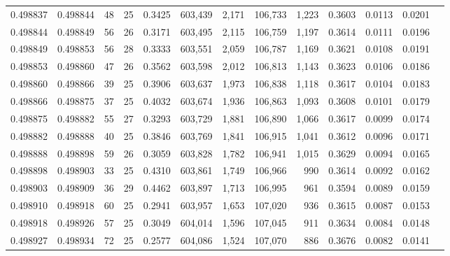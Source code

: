 \begin{tabular}{rrrrrrrrrrrrr}
0.498837 & 0.498844 &  48 &  25 &                                     0.3425 & 603,439 &   2,171 & 106,733 &   1,223 & 0.3603 & 0.0113 & 0.0201 \\
0.498844 & 0.498849 &  56 &  26 &                                     0.3171 & 603,495 &   2,115 & 106,759 &   1,197 & 0.3614 & 0.0111 & 0.0196 \\
0.498849 & 0.498853 &  56 &  28 &                                     0.3333 & 603,551 &   2,059 & 106,787 &   1,169 & 0.3621 & 0.0108 & 0.0191 \\
0.498853 & 0.498860 &  47 &  26 &                                     0.3562 & 603,598 &   2,012 & 106,813 &   1,143 & 0.3623 & 0.0106 & 0.0186 \\
0.498860 & 0.498866 &  39 &  25 &                                     0.3906 & 603,637 &   1,973 & 106,838 &   1,118 & 0.3617 & 0.0104 & 0.0183 \\
0.498866 & 0.498875 &  37 &  25 &                                     0.4032 & 603,674 &   1,936 & 106,863 &   1,093 & 0.3608 & 0.0101 & 0.0179 \\
0.498875 & 0.498882 &  55 &  27 &                                     0.3293 & 603,729 &   1,881 & 106,890 &   1,066 & 0.3617 & 0.0099 & 0.0174 \\
0.498882 & 0.498888 &  40 &  25 &                                     0.3846 & 603,769 &   1,841 & 106,915 &   1,041 & 0.3612 & 0.0096 & 0.0171 \\
0.498888 & 0.498898 &  59 &  26 &                                     0.3059 & 603,828 &   1,782 & 106,941 &   1,015 & 0.3629 & 0.0094 & 0.0165 \\
0.498898 & 0.498903 &  33 &  25 &                                     0.4310 & 603,861 &   1,749 & 106,966 &     990 & 0.3614 & 0.0092 & 0.0162 \\
0.498903 & 0.498909 &  36 &  29 &                                     0.4462 & 603,897 &   1,713 & 106,995 &     961 & 0.3594 & 0.0089 & 0.0159 \\
0.498910 & 0.498918 &  60 &  25 &                                     0.2941 & 603,957 &   1,653 & 107,020 &     936 & 0.3615 & 0.0087 & 0.0153 \\
0.498918 & 0.498926 &  57 &  25 &                                     0.3049 & 604,014 &   1,596 & 107,045 &     911 & 0.3634 & 0.0084 & 0.0148 \\
0.498927 & 0.498934 &  72 &  25 &                                     0.2577 & 604,086 &   1,524 & 107,070 &     886 & 0.3676 & 0.0082 & 0.0141 \\

\end{tabular}
